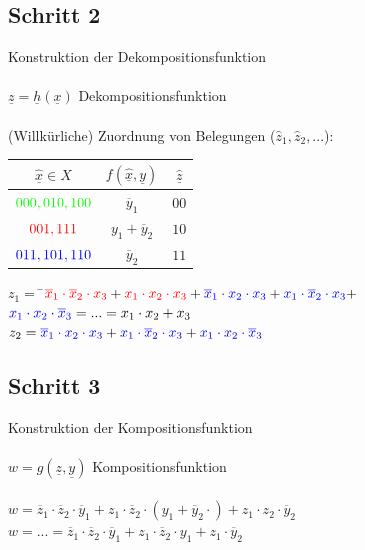 \documentclass[a4paper,twocolumn,10pt]{article}
\begin{document}
\subsection*{Schritt 2}
Konstruktion der Dekompositionsfunktion\\\\
$\underline{z}=\underline{h}(\underline{x})$ Dekompositionsfunktion\\ \\
(Willkürliche) Zuordnung von Belegungen ($\hat{z}_1,\hat{z}_2,...$):
\begin{center}
\begin{tabular}{|c|c|c|}
\hline $\underline{\hat{x}}\in X$ & $f(\underline{\hat{x}}, \underline{y})$ & $\underline{\hat{z}}$ \\ 
\hline ${\color{green}000,010,100}$ & $\overline{y}_1$ & $00$ \\ 
\hline ${\color{red}001,111}$ & $y_1+\overline{y}_2$ & $10$ \\ 
\hline ${\color{blue}011,101,110}$ & $\overline{y}_2$ & $11$ \\ 
\hline 
\end{tabular}
\end{center}
\begin{tabbing}
$z_1=$ \=${\color{red}\overline{x}_1\cdot \overline{x}_2\cdot x_3}+{\color{red}x_1\cdot x_2\cdot x_3}+{\color{blue}\overline{x}_1\cdot x_2\cdot x_3}+{\color{blue}x_1\cdot \overline{x}_2\cdot x_3}+$\\
\>${\color{blue}x_1\cdot x_2\cdot \overline{x}_3}=...=x_1\cdot x_2+x_3$\\
$z_2={\color{blue}\overline{x}_1\cdot x_2\cdot x_3}+{\color{blue}x_1\cdot \overline{x}_2\cdot x_3}+{\color{blue}x_1\cdot x_2\cdot \overline{x}_3}$
\end{tabbing}

\subsection*{Schritt 3}
Konstruktion der Kompositionsfunktion\\\\
$w=g(\underline{z},\underline{y})$ Kompositionsfunktion\\\\
$w=\overline{z}_1\cdot \overline{z}_2\cdot \overline{y}_1+z_1\cdot \overline{z}_2\cdot (y_1+\overline{y}_2\cdot)+z_1\cdot z_2\cdot \overline{y}_2$\\
$w=...=\overline{z}_1\cdot \overline{z}_2\cdot \overline{y}_1+z_1\cdot \overline{z}_2\cdot y_1+z_1\cdot\overline{y}_2$
\end{document}
